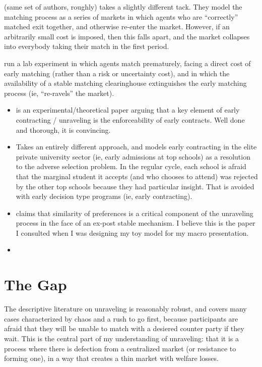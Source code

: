 \documentclass[WP]{AEA}
\begin{document}
\cite{Damiano2005} (same set of authors, roughly) takes a slightly different tack.  They model the matching process as a series of markets in which agents who are “correctly” matched exit together, and otherwise re-enter the market.  However, if an arbitrarily small cost is imposed, then this falls apart, and the market collapses into everybody taking their match in the first period. 


\cite{Kagel2000} run a lab experiment in which agents match prematurely, facing a direct cost of early matching (rather than a risk or uncertainty cost), and in which the availability of a stable matching clearinghouse extinguishes the early matching process (ie, “re-ravels” the market).
\begin{itemize}
	\item \cite{Niederle2004} is an experimental/theoretical paper arguing that a key element of early contracting / unraveling is the enforceability of early contracts.  Well done and thorough, it is convincing.
	\item   \cite{Lee2009}Takes an entirely different approach, and models early contracting in the elite private university sector (ie, early admissions at top schools) as a resolution to the adverse selection problem.  In the regular cycle, each school is afraid that the marginal student it accepts (and who chooses to attend) was rejected by the other top schools because they had particular insight.  That is avoided with early decision type programs (ie, early contracting).
	\item  \cite{Halaburda2010} claims that similarity of preferences is a critical component of the unraveling process in the face of an ex-post stable mechanism.  I believe this is the paper I consulted when I was designing my toy model for my macro presentation.  
	\item 
\end{itemize}



\section{The Gap}

The descriptive literature on unraveling is reasonably robust, and covers many cases characterized by chaos and a rush to go first, because participants are afraid that they will be unable to match with a desiered counter party if they wait. This is the central part of my understanding of unraveling: that it is a process where there is defection from a centralized market (or resistance to forming one), in a way that creates a thin market with welfare losses.  
\end{document}

